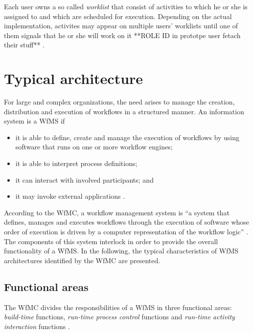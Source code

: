     Each user owns a so called \emph{worklist} that consist of activities to which he or she is assigned to and which are scheduled for execution. Depending on the actual implementation, activites may appear on multiple users' worklists until one of them signals that he or she will work on it **ROLE ID in prototpe user fetach their stuff** \cite{Hollingsworth1995Wfmc,Casati1999Specification}.


\section{Typical architecture} %
\label{sec:typical_architecture}
  For large and complex organizations, the need arises to manage the creation, distribution and execution of workflows in a structured manner. An information system is a \ac{WfMS} if
  \begin{itemize}[nosep]
    \item it is able to define, create and manage the execution of workflows by using software that runs on one or more workflow engines;
    \item it is able to interpret process definitions;
    \item it can interact with involved participants; and
    \item it may invoke external applications \cite{Lawrence1997Workflow}.
  \end{itemize}

  According to the \ac{WfMC}, a workflow management system is ``a system that defines, manages and executes workflows through the execution of software whose order of execution is driven by a computer representation of the workflow logic'' \cite{Hollingsworth1995Wfmc}. The components of this system interlock in order to provide the overall functionality of a \ac{WfMS}. In the following, the typical characteristics of \ac{WfMS} architectures identified by the \ac{WfMC} are presented.

  \subsection{Functional areas} %
  \label{sub:functional_areas}
    The \ac{WfMC} divides the responsibilities of a \ac{WfMS} in three functional areas: \emph{build-time} functions, \emph{run-time process control} functions and \emph{run-time activity interaction} functions \cite{Hollingsworth1995Wfmc, Alonso1997Functionality}.

